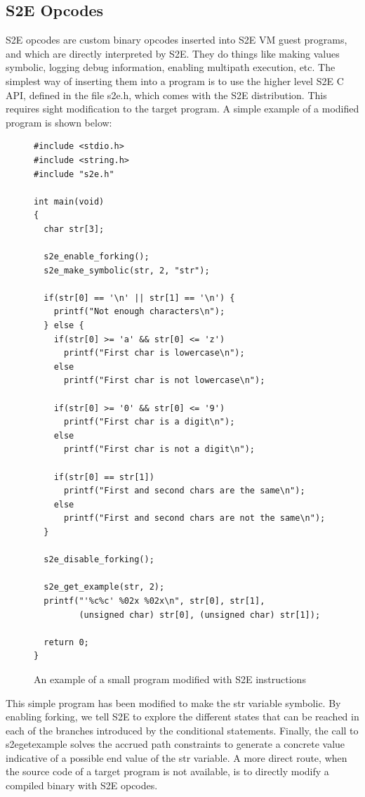 \documentclass[11pt]{article}
\begin{document}
\subsection{S2E Opcodes}
S2E opcodes are custom binary opcodes inserted into S2E VM guest programs, and
which are directly interpreted by S2E. They do things like making values
symbolic, logging debug information, enabling multipath execution, etc. The
simplest way of inserting them into a program is to use the higher level S2E C
API, defined in the file s2e.h, which comes with the S2E distribution. This
requires sight modification to the target program.
A simple example of a modified program is shown below:
\begin{figure}[htp]
\begin{verbatim}
#include <stdio.h>
#include <string.h>
#include "s2e.h"

int main(void)
{
  char str[3];

  s2e_enable_forking();
  s2e_make_symbolic(str, 2, "str");

  if(str[0] == '\n' || str[1] == '\n') {
    printf("Not enough characters\n");
  } else {
    if(str[0] >= 'a' && str[0] <= 'z')
      printf("First char is lowercase\n");
    else
      printf("First char is not lowercase\n");

    if(str[0] >= '0' && str[0] <= '9')
      printf("First char is a digit\n");
    else
      printf("First char is not a digit\n");

    if(str[0] == str[1])
      printf("First and second chars are the same\n");
    else
      printf("First and second chars are not the same\n");
  }

  s2e_disable_forking();

  s2e_get_example(str, 2);
  printf("'%c%c' %02x %02x\n", str[0], str[1],
         (unsigned char) str[0], (unsigned char) str[1]);

  return 0;
}
\end{verbatim}
\caption{An example of a small program modified with S2E instructions}
\end{figure}
\newpage
This simple program has been modified to make the str variable symbolic. By
enabling forking, we tell S2E to explore the different states that can be
reached in each of the branches introduced by the conditional
statements. Finally, the call to s2e\textunderscore get\textunderscore example
solves the accrued path constraints to generate a concrete value indicative of a
possible end value of the str variable. A more direct route, when the source
code of a target program is not available, is to directly modify a compiled
binary with S2E opcodes.
\end{document}
